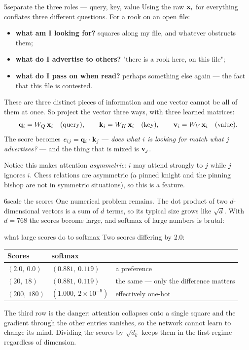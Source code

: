 \begin{attempt}{5}{separate the three roles --- query, key, value}
Using the raw $\mathbf{x}_i$ for everything conflates three different questions. For a rook on an
open file:
\begin{itemize}
\item \textbf{what am I looking for?} squares along my file, and whatever obstructs them;
\item \textbf{what do I advertise to others?} "there is a rook here, on this file";
\item \textbf{what do I pass on when read?} perhaps something else again --- the fact that
  this file is contested.
\end{itemize}
These are three distinct pieces of information and one vector cannot be all of them at once.
So project the vector three ways, with three learned matrices:
\[
  \mathbf{q}_i = W_Q\,\mathbf{x}_i \quad(\text{query}),\qquad
  \mathbf{k}_i = W_K\,\mathbf{x}_i \quad(\text{key}),\qquad
  \mathbf{v}_i = W_V\,\mathbf{x}_i \quad(\text{value}).
\]
The score becomes $e_{ij} = \mathbf{q}_i\cdot\mathbf{k}_j$ --- \emph{does what $i$ is looking for
match what $j$ advertises?} --- and the thing that is mixed is $\mathbf{v}_j$.

Notice this makes attention \emph{asymmetric}: $i$ may attend strongly to $j$ while $j$
ignores $i$. Chess relations are asymmetric (a pinned knight and the pinning bishop are not in
symmetric situations), so this is a feature.
\end{attempt}

\begin{attempt}{6}{scale the scores}
One numerical problem remains. The dot product of two $d$-dimensional vectors is a sum of $d$
terms, so its typical size grows like $\sqrt{d}$. With $d = 768$ the scores become large, and
softmax of large numbers is brutal:

\begin{worked}{what large scores do to softmax}
Two scores differing by 2.0:
\begin{center}
\begin{tabular}{@{}lll@{}}
\toprule
Scores & softmax & \\
\midrule
$(2.0,\ 0.0)$   & $(0.881,\ 0.119)$ & a preference \\
$(20,\ 18)$     & $(0.881,\ 0.119)$ & the same --- only the difference matters \\
$(200,\ 180)$   & $(1.000,\ 2\times10^{-9})$ & effectively one-hot \\
\bottomrule
\end{tabular}
\end{center}
The third row is the danger: attention collapses onto a single square and the gradient
through the other entries vanishes, so the network cannot learn to change its mind. Dividing
the scores by $\sqrt{d_k}$ keeps them in the first regime regardless of dimension.
\end{worked}
\end{attempt}

